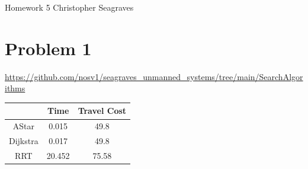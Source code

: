 \documentclass{article}
\begin{document}
    \raggedright
    Homework 5 \break
    Christopher Seagraves

    \section*{Problem 1}
    \url{https://github.com/nosv1/seagraves_unmanned_systems/tree/main/SearchAlgorithms} \break

    \begin{tabular}{|c|c|c|}
        \hline
        & Time & Travel Cost \\
        \hline
        AStar & 0.015 & 49.8 \\
        \hline
        Dijkstra & 0.017 & 49.8 \\
        \hline
        RRT & 20.452 & 75.58 \\
        \hline
    \end{tabular} \break
\end{document}
